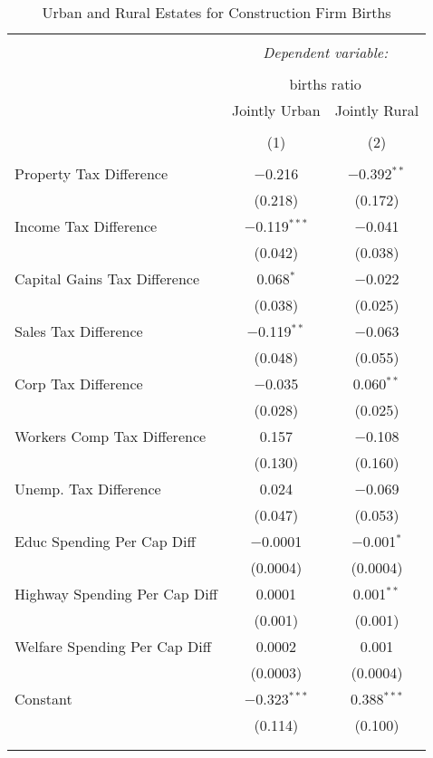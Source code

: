 
\begin{table}[!htbp] \centering 
  \caption{Urban and Rural Estates for  Construction Firm Births} 
  \label{} 
\begin{tabular}{@{\extracolsep{5pt}}lcc} 
\\[-1.8ex]\hline 
\hline \\[-1.8ex] 
 & \multicolumn{2}{c}{\textit{Dependent variable:}} \\ 
\cline{2-3} 
\\[-1.8ex] & \multicolumn{2}{c}{births ratio} \\ 
 & Jointly Urban & Jointly Rural \\ 
\\[-1.8ex] & (1) & (2)\\ 
\hline \\[-1.8ex] 
 Property Tax Difference & $-$0.216 & $-$0.392$^{**}$ \\ 
  & (0.218) & (0.172) \\ 
  Income Tax Difference & $-$0.119$^{***}$ & $-$0.041 \\ 
  & (0.042) & (0.038) \\ 
  Capital Gains Tax Difference & 0.068$^{*}$ & $-$0.022 \\ 
  & (0.038) & (0.025) \\ 
  Sales Tax Difference & $-$0.119$^{**}$ & $-$0.063 \\ 
  & (0.048) & (0.055) \\ 
  Corp Tax Difference & $-$0.035 & 0.060$^{**}$ \\ 
  & (0.028) & (0.025) \\ 
  Workers Comp Tax Difference & 0.157 & $-$0.108 \\ 
  & (0.130) & (0.160) \\ 
  Unemp. Tax Difference & 0.024 & $-$0.069 \\ 
  & (0.047) & (0.053) \\ 
  Educ Spending Per Cap Diff & $-$0.0001 & $-$0.001$^{*}$ \\ 
  & (0.0004) & (0.0004) \\ 
  Highway Spending Per Cap Diff & 0.0001 & 0.001$^{**}$ \\ 
  & (0.001) & (0.001) \\ 
  Welfare Spending Per Cap Diff & 0.0002 & 0.001 \\ 
  & (0.0003) & (0.0004) \\ 
  Constant & $-$0.323$^{***}$ & 0.388$^{***}$ \\ 
  & (0.114) & (0.100) \\ 
 \hline \\[-1.8ex] 
\hline 
\hline \\[-1.8ex] 
\end{tabular} 
\end{table} 
